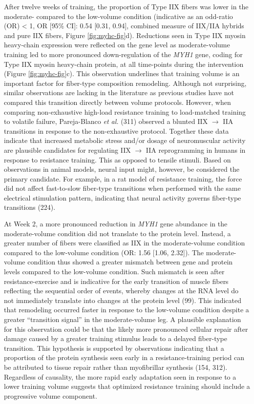\documentclass[twoside,10pt]{gihclass} %
\begin{document}
After twelve weeks of training, the proportion of Type IIX fibers was lower in the moderate- compared to the low-volume condition (indicative as an odd-ratio (OR) \textless{} 1, OR {[}95\% CI{]}: 0.54 {[}0.31, 0.94{]}, combined measure of IIX/IIA hybrids and pure IIX fibers, Figure \ref{fig:myhc-fig}d). Reductions seen in Type IIX myosin heavy-chain expression were reflected on the gene level as moderate-volume training led to more pronounced down-regulation of the \emph{MYH1} gene, coding for Type IIX myosin heavy-chain protein, at all time-points during the intervention (Figure \ref{fig:myhc-fig}c).
This observation underlines that training volume is an important factor for fiber-type composition remodeling. Although not surprising, similar observations are lacking in the literature as previous studies have not compared this transition directly between volume protocols.
However, when comparing non-exhaustive high-load resistance training to load-matched training to volatile failure, Pareja-Blanco \emph{et al.}
(311)
observed a blunted IIX \(\rightarrow\) IIA transitions in response to the non-exhaustive protocol.
Together these data indicate that increased metabolic stress and/or dosage of neuromuscular activity are plausible candidates for regulating IIX \(\rightarrow\) IIA reprogramming in humans in response to resistance training.
This as opposed to tensile stimuli.
Based on observations in animal models, neural input might, however, be considered the primary candidate.
For example, in a rat model of resistance training, the force did not affect fast-to-slow fiber-type transitions when performed with the same electrical stimulation pattern, indicating that neural activity governs fiber-type transitions
(224).

At Week 2, a more pronounced reduction in \emph{MYH1} gene abundance in the moderate-volume condition did not translate to the protein level. Instead, a greater number of fibers were classified as IIX in the moderate-volume condition compared to the low-volume condition (OR: 1.56 {[}1.06, 2.32{]}).
The moderate-volume condition thus showed a greater mismatch between gene and protein levels compared to the low-volume condition.
Such mismatch is seen after resistance-exercise and is indicative for the early transition of muscle fibers reflecting the sequential order of events, whereby changes at the RNA level do not immediately translate into changes at the protein level
(99).
This indicated that remodeling occurred faster in response to the low-volume condition despite a greater ``transition signal'' in the moderate-volume leg.
A plausible explanation for this observation could be that the likely more pronounced cellular repair after damage caused by a greater training stimulus leads to a delayed fiber-type transition.
This hypothesis is supported by observations indicating that a proportion of the protein synthesis seen early in a resistance-training period can be attributed to tissue repair rather than myofibrillar synthesis
(154, 312).
Regardless of causality, the more rapid early adaptation seen in response to a lower training volume suggests that optimized resistance training should include a progressive volume component.
\end{document}
